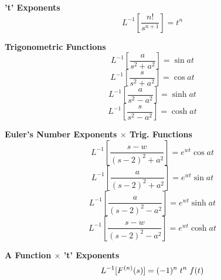 \documentclass[12pt, a4paper]{article}
\numberwithin{equation}{section}
\begin{document}
	\textbf{'t' Exponents}
	\begin{equation}
		L^{-1}\left[\frac{n!}{s^{n+1}}\right] = t^n
		\label{eq_inverse_laplace_trans_t_exponent}
	\end{equation}
	
	\textbf{Trigonometric Functions}
	\begin{equation}
		L^{-1}\left[\frac{a}{s^2 + a^2}\right] = \sin at
		\label{eq_inverse_laplace_trans_trig_sin}
	\end{equation}
	\begin{equation}
		L^{-1}\left[\frac{s}{s^2 + a^2}\right] = \cos at
		\label{eq_inverse_laplace_trans_trig_cos}
	\end{equation}
	\begin{equation}
		L^{-1}\left[\frac{a}{s^2 - a^2}\right]  = \sinh at
		\label{eq_inverse_laplace_trans_trig_sinh}
	\end{equation}
	\begin{equation}
		L^{-1}\left[\frac{s}{s^2 - a^2}\right]  = \cosh at
		\label{eq_inverse_laplace_trans_trig_cosh}
	\end{equation}
	
	\textbf{Euler's Number Exponents $\times$ Trig. Functions}
	\begin{equation}
		L^{-1}\left[\frac{s - w}{(s - 2)^2 + a^2}\right] = e^{wt} \cos at
		\label{eq_inverse_laplace_trans_trig_cos_euler}
	\end{equation}
	\begin{equation}
		L^{-1}\left[\frac{a}{(s - 2)^2 + a^2}\right] = e^{wt} \sin at
		\label{eq_inverse_laplace_trans_trig_sin_euler}
	\end{equation}
	\begin{equation}
		L^{-1}\left[\frac{a}{(s - 2)^2 - a^2}\right] = e^{wt} \sinh at
		\label{eq_inverse_laplace_trans_trig_sinh_euler}
	\end{equation}
	\begin{equation}
		L^{-1}\left[\frac{s - w}{(s - 2)^2 - a^2}\right] = e^{wt} \cosh at
		\label{eq_inverse_laplace_trans_trig_cosh_euler}
	\end{equation}
	
	\textbf{A Function $\times$ 't' Exponents}
	\begin{equation}
		L^{-1}[F^{(n)}(s)] = (-1)^n \hspace{0.1cm} t^n \hspace{0.1cm} f(t)
		\label{eq_inverse_laplace_trans_function_t}
	\end{equation}\\
\end{document}

